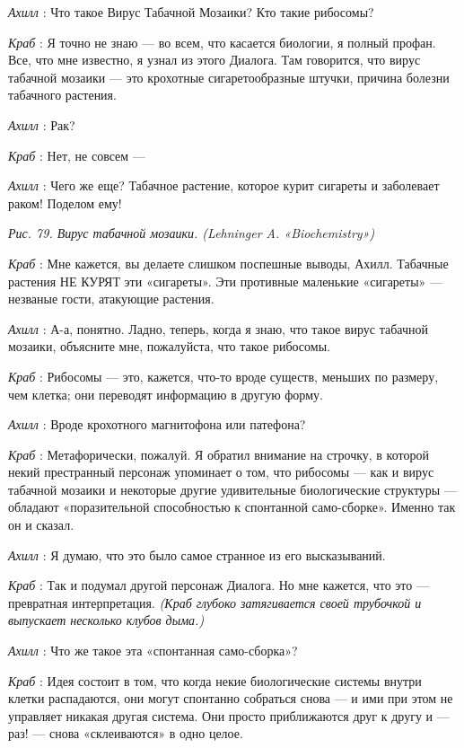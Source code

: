 \emph{Ахилл} : Что такое Вирус Табачной Мозаики? Кто такие рибосомы?

\emph{Краб} : Я точно не знаю --- во всем, что касается биологии, я полный профан. Все, что мне известно, я узнал из этого Диалога. Там говорится, что вирус табачной мозаики --- это крохотные сигаретообразные штучки, причина болезни табачного растения.

\emph{Ахилл} : Рак?

\emph{Краб} : Нет, не совсем ---

\emph{Ахилл} : Чего же еще? Табачное растение, которое курит сигареты и заболевает раком! Поделом ему!

\emph{Рис. 79. Вирус табачной мозаики. (Lehninger A. «Biochemistry»)}

\emph{Краб} : Мне кажется, вы делаете слишком поспешные выводы, Ахилл. Табачные растения НЕ КУРЯТ эти «сигареты». Эти противные маленькие «сигареты» --- незваные гости, атакующие растения.

\emph{Ахилл} : А-а, понятно. Ладно, теперь, когда я знаю, что такое вирус табачной мозаики, объясните мне, пожалуйста, что такое рибосомы.

\emph{Краб} : Рибосомы --- это, кажется, что-то вроде существ, меньших по размеру, чем клетка; они переводят информацию в другую форму.

\emph{Ахилл} : Вроде крохотного магнитофона или патефона?

\emph{Краб} : Метафорически, пожалуй. Я обратил внимание на строчку, в которой некий престранный персонаж упоминает о том, что рибосомы --- как и вирус табачной мозаики и некоторые другие удивительные биологические структуры --- обладают «поразительной способностью к спонтанной само-сборке». Именно так он и сказал.

\emph{Ахилл} : Я думаю, что это было самое странное из его высказываний.

\emph{Краб} : Так и подумал другой персонаж Диалога. Но мне кажется, что это --- превратная интерпретация. \emph{(Краб глубоко затягивается своей трубочкой и выпускает несколько клубов дыма.)}

\emph{Ахилл} : Что же такое эта «спонтанная само-сборка»?

\emph{Краб} : Идея состоит в том, что когда некие биологические системы внутри клетки распадаются, они могут спонтанно собраться снова --- и ими при этом не управляет никакая другая система. Они просто приближаются друг к другу и --- раз! --- снова «склеиваются» в одно целое.

